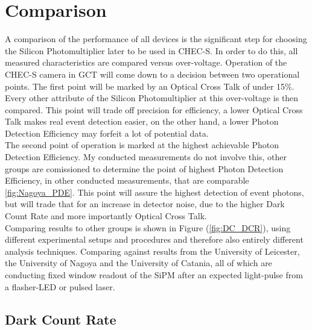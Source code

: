 \documentclass[12pt,article,type=msc,colorback,accentcolor=tud9c]{tudthesis}
\begin{document}
\section{\Large Comparison}
\label{sec:comparison}
A comparison of the performance of all devices is the significant step for choosing the Silicon Photomultiplier later to be used in CHEC-S. In order to do this, all measured characteristics are compared versus over-voltage. Operation of the CHEC-S camera in GCT will come down to a decision between two operational points. The first point will be marked by an Optical Cross Talk of under 15\%. Every other attribute of the Silicon Photomultiplier at this over-voltage is then compared. This point will trade off precision for efficiency, a lower Optical Cross Talk makes real event detection easier, on the other hand, a lower Photon Detection Efficiency may forfeit a lot of potential data.\\
The second point of operation is marked at the highest achievable Photon Detection Efficiency. My conducted measurements do not involve this, other groups are comissioned to determine the point of highest Photon Detection Efficiency, in other conducted measurements, that are comparable \ref{fig:Nagoya_PDE}. This point will assure the highest detection of event photons, but will trade that for an increase in detector noise, due to the higher Dark Count Rate and more importantly Optical Cross Talk.\\
Comparing results to other groups is shown in Figure (\ref{fig:DC_DCR}), using different experimental setups and procedures and therefore also entirely different analysis techniques. Comparing against results from the University of Leicester, the University of Nagoya and the University of Catania, all of which are conducting fixed window readout of the SiPM after an expected light-pulse from a flasher-LED or pulsed laser. 

\subsection{Dark Count Rate}
\label{subsec:DC_DCR}
\end{document}
